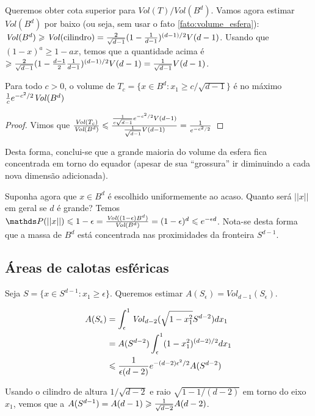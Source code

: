 Queremos obter cota superior para $\mathit{Vol}(T)/\mathit{Vol}(B^d)$. Vamos agora estimar $\mathit{Vol}(B^d)$ por baixo (ou seja, sem usar o fato \ref{fato:volume_esfera}): $\mathit{Vol}(B^d) \geqslant \mathit{Vol}(\mathrm{cilindro}) = {2\over \sqrt{d-1}} (1-{1 \over d-1})^{(d-1)/2} V(d-1)$. Usando que $(1-x)^a \geqslant 1-ax$, temos que a quantidade acima é $\geqslant {2\over \sqrt{d-1}} (1-{d-1 \over 2}{1 \over d-1})^{(d-1)/2} V(d-1) = {1 \over \sqrt{d-1}} V(d-1)$.

\begin{lema}
 Para todo $c > 0$, o volume de $T_c = \{x \in B^d: x_1 \geqslant c/\sqrt{d-1}\}$ é no máximo ${1\over c} e^{-c^2/2} \mathit{Vol}(B^d)$
\end{lema}

\begin{proof}
Vimos que ${\mathit{Vol}(T_c) \over \mathit{Vol}(B^d)} \leqslant {{1\over c\sqrt{d-1}} e^{-c^2/2} V(d-1) \over {1\over \sqrt{d-1}} V(d-1)} = {1\over e^{-c^2/2}}$
\end{proof}

Desta forma, conclui-se que a grande maioria do volume da esfera fica concentrada em torno do equador (apesar de sua “grossura” ir diminuindo a cada nova dimensão adicionada).

Suponha agora que $x \in B^d$ é escolhido uniformemente ao acaso. Quanto será $||x||$ em geral se $d$ é grande? Temos $\PP(||x||) \leqslant 1-\epsilon = {\mathit{Vol}((1-\epsilon)B^d) \over \mathit{Vol}(B^d)} = (1-\epsilon)^d \leqslant e^{-\epsilon d}$. Nota-se desta forma que a massa de $B^d$ está concentrada nas proximidades da fronteira $S^{d-1}$.

\subsection{Áreas de calotas esféricas}

Seja $S = \{x \in S^{d-1}: x_1 \geqslant \epsilon\}$. Queremos estimar $A(S_\epsilon) = \mathit{Vol}_{d-1}(S_\epsilon)$.

\begin{align*}
  A(S_\epsilon) &= \int_\epsilon^1 \mathit{Vol}_{d-2}(\sqrt{1-x_1^2}S^{d-2}) dx_1 \\
      &= A(S^{d-2}) \int_\epsilon^1 (1-x_1^2)^{(d-2)/2} dx_1 \\
      &\leqslant {1\over \epsilon (d-2) } e^{-(d-2)\epsilon^2/2} A(S^{d-2})
\end{align*}

Usando o cilindro de altura $1/\sqrt{d-2}$ e raio $\sqrt{1- 1/(d-2)}$ em torno do eixo $x_1$, vemos que a $A(S^{d-1}) = A(d-1) \geqslant {1 \over \sqrt{d-2}} A(d-2)$.

